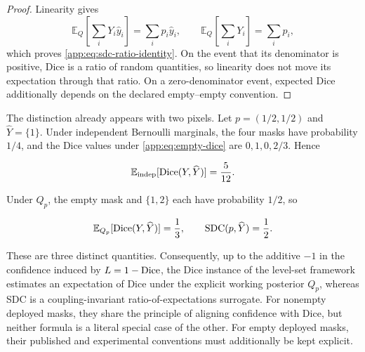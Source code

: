 \begin{proof}
Linearity gives
\begin{equation*}
  \mathbb{E}_Q\!\left[\sum_iY_i\widehat y_i\right]
  =\sum_i p_i\widehat y_i,
  \qquad
  \mathbb{E}_Q\!\left[\sum_iY_i\right]=\sum_i p_i,
\end{equation*}
which proves \cref{app:eq:sdc-ratio-identity}. On the event that its
denominator is positive, Dice is a ratio of random quantities, so linearity
does not move its expectation through that ratio. On a zero-denominator event,
expected Dice additionally depends on the declared empty--empty convention.
\end{proof}

The distinction already appears with two pixels.  Let
$p=(1/2,1/2)$ and $\widehat Y=\{1\}$.  Under independent Bernoulli
marginals, the four masks have probability $1/4$, and the Dice values
under \cref{app:eq:empty-dice} are $0,1,0,2/3$. Hence

\begin{equation*}
  \mathbb{E}_{\mathrm{indep}}[
    \operatorname{Dice}(Y,\widehat Y)]=\frac5{12}.
\end{equation*}

Under $Q_p$, the empty mask and $\{1,2\}$ each have probability $1/2$,
so

\begin{equation*}
  \mathbb{E}_{Q_p}[\operatorname{Dice}(Y,\widehat Y)]=\frac13,
  \qquad
  \operatorname{SDC}(p,\widehat Y)=\frac12.
\end{equation*}

These are three distinct quantities.  Consequently, up to the additive
$-1$ in the confidence induced by $L=1-\operatorname{Dice}$, the Dice instance of the
level-set framework estimates an expectation of Dice under the explicit
working posterior $Q_p$, whereas SDC is a coupling-invariant
ratio-of-expectations surrogate. For nonempty deployed masks, they share the
principle of aligning confidence with Dice, but neither formula is a literal
special case of the other. For empty deployed masks, their published and
experimental conventions must additionally be kept explicit.
